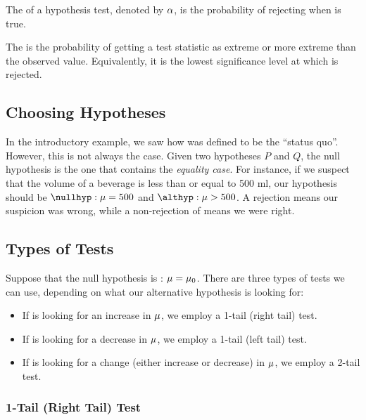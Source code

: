\begin{definition}
    The  of a hypothesis test, denoted by $\alpha$, is the probability of rejecting \nullhyp{} when \nullhyp{} is true.
\end{definition}

\begin{definition}
    The  is the probability of getting a test statistic as extreme or more extreme than the observed value. Equivalently, it is the lowest significance level at which \nullhyp{} is rejected.
\end{definition}

\subsection{Choosing Hypotheses}

In the introductory example, we saw how \nullhyp{} was defined to be the ``status quo''. However, this is not always the case. Given two hypotheses $P$ and $Q$, the null hypothesis is the one that contains the \emph{equality case}. For instance, if we suspect that the volume of a beverage is less than or equal to 500 ml, our hypothesis should be $\nullhyp: \m = 500$ and $\althyp: \m > 500$. A rejection \nullhyp{} means our suspicion was wrong, while a non-rejection of \nullhyp{} means we were right.

\subsection{Types of Tests}

Suppose that the null hypothesis is \nullhyp: $\mu = \mu_0$. There are three types of tests we can use, depending on what our alternative hypothesis is looking for:
\begin{itemize}
    \item If \althyp{} is looking for an increase in $\mu$, we employ a 1-tail (right tail) test.
    \item If \althyp{} is looking for a decrease in $\mu$, we employ a 1-tail (left tail) test.
    \item If \althyp{} is looking for a change (either increase or decrease) in $\mu$, we employ a 2-tail test.
\end{itemize}

\subsubsection{1-Tail (Right Tail) Test}

